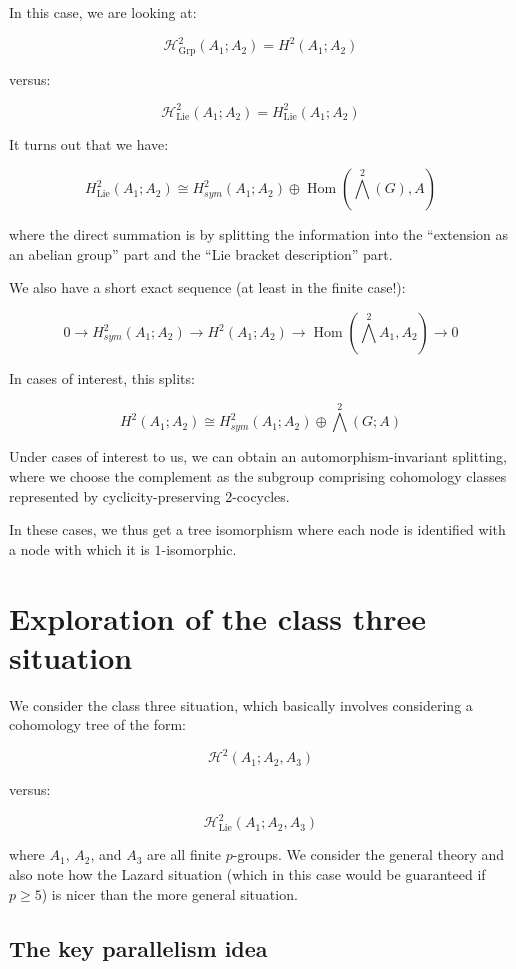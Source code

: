 \documentclass[10pt]{amsart}
\begin{document}
In this case, we are looking at:

$$\mathcal{H}^2_{\operatorname{Grp}}(A_1;A_2) = H^2(A_1;A_2)$$

versus:

$$\mathcal{H}^2_{\operatorname{Lie}}(A_1;A_2) = H^2_{\operatorname{Lie}}(A_1;A_2)$$

It turns out that we have:

$$H^2_{\operatorname{Lie}}(A_1;A_2) \cong H^2_{sym}(A_1;A_2) \oplus \operatorname{Hom}(\bigwedge^2(G),A)$$

where the direct summation is by splitting the information into the
``extension as an abelian group'' part and the ``Lie bracket
description'' part.

We also have a short exact sequence (at least in the finite case!):

$$0 \to H^2_{sym}(A_1;A_2) \to H^2(A_1;A_2) \to \operatorname{Hom}(\bigwedge^2A_1,A_2) \to 0$$

In cases of interest, this splits:

$$H^2(A_1;A_2) \cong H^2_{sym}(A_1;A_2) \oplus \bigwedge^2(G;A)$$

Under cases of interest to us, we can obtain an automorphism-invariant
splitting, where we choose the complement as the subgroup comprising
cohomology classes represented by cyclicity-preserving 2-cocycles.

In these cases, we thus get a tree isomorphism where each node is
identified with a node with which it is $1$-isomorphic.

\section{Exploration of the class three situation}

We consider the class three situation, which basically involves
considering a cohomology tree of the form:

$$\mathcal{H}^2(A_1;A_2,A_3)$$

versus:

$$\mathcal{H}^2_{\text{Lie}}(A_1;A_2,A_3)$$

where $A_1$, $A_2$, and $A_3$ are all finite $p$-groups. We consider
the general theory and also note how the Lazard situation (which in
this case would be guaranteed if $p \ge 5$) is nicer than the more
general situation.

\subsection{The key parallelism idea}
\end{document}

